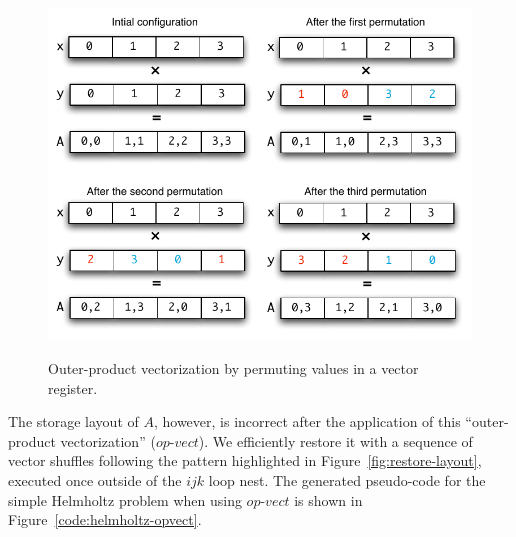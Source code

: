 \documentclass[conference]{IEEEtran}
\begin{document}

\begin{figure}[h]
\normalsize
\centerline{\includegraphics[scale=0.6]{Pictures/vect-by-vect.pdf}
\label{fig:vect-by-vect}}
\caption{Outer-product vectorization by permuting values in a vector register.}
\end{figure}

The storage layout of $A$, however, is incorrect after the application of this ``outer-product vectorization'' ($op$-$vect$). We efficiently restore it with a sequence of vector shuffles following the pattern highlighted in Figure~\ref{fig:restore-layout}, executed once outside of the $ijk$ loop nest. The generated pseudo-code for the simple Helmholtz problem when using $op$-$vect$ is shown in Figure~\ref{code:helmholtz-opvect}.
\end{document}
